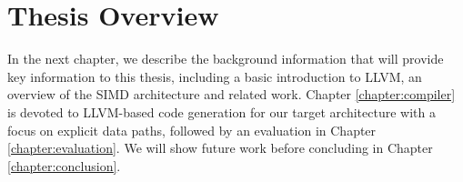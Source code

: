 \section{Thesis Overview}


In the next chapter, we describe the background information that will provide key information to this thesis, including a basic introduction to LLVM, an overview of the SIMD architecture and related work. Chapter \ref{chapter:compiler} is devoted to LLVM-based code generation for our target architecture with a focus on explicit data paths, followed by an evaluation in Chapter \ref{chapter:evaluation}. We will show future work %
before concluding in Chapter \ref{chapter:conclusion}.

